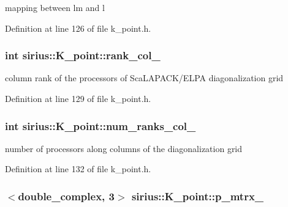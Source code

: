 mapping between lm and l 



Definition at line 126 of file k\+\_\+point.\+h.

\hypertarget{classsirius_1_1_k__point_aa10c7539cc86b6a36c2b17b593fc6ad3}{}
\subsubsection[{rank\+\_\+col\+\_\+}]{\setlength{\rightskip}{0pt plus 5cm}int sirius\+::\+K\+\_\+point\+::rank\+\_\+col\+\_\+\hspace{0.3cm}{\ttfamily [private]}}\label{classsirius_1_1_k__point_aa10c7539cc86b6a36c2b17b593fc6ad3}


column rank of the processors of Sca\+L\+A\+P\+A\+C\+K/\+E\+L\+P\+A diagonalization grid 



Definition at line 129 of file k\+\_\+point.\+h.

\hypertarget{classsirius_1_1_k__point_ab03535344a72df246d0832000093ad2e}{}
\subsubsection[{num\+\_\+ranks\+\_\+col\+\_\+}]{\setlength{\rightskip}{0pt plus 5cm}int sirius\+::\+K\+\_\+point\+::num\+\_\+ranks\+\_\+col\+\_\+\hspace{0.3cm}{\ttfamily [private]}}\label{classsirius_1_1_k__point_ab03535344a72df246d0832000093ad2e}


number of processors along columns of the diagonalization grid 



Definition at line 132 of file k\+\_\+point.\+h.

\hypertarget{classsirius_1_1_k__point_a2efb48aea899a01b6f2fd7ae295bb556}{}
\subsubsection[{p\+\_\+mtrx\+\_\+}]{$<$double\+\_\+complex, 3$>$ sirius\+::\+K\+\_\+point\+::p\+\_\+mtrx\+\_\+\hspace{0.3cm}{\ttfamily [private]}}\label{classsirius_1_1_k__point_a2efb48aea899a01b6f2fd7ae295bb556}


